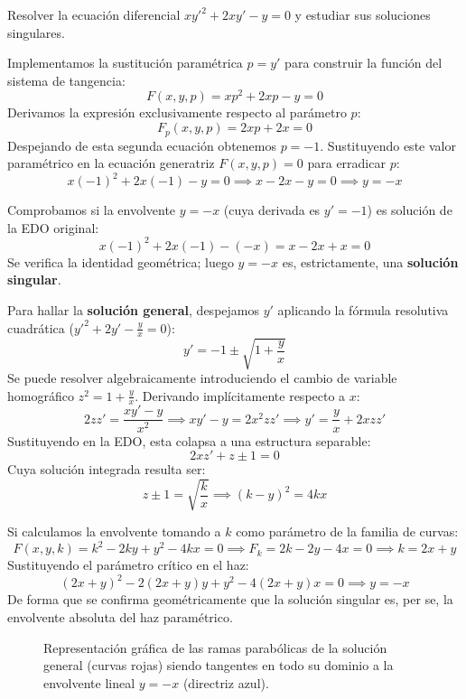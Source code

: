 \begin{ejercicio}
Resolver la ecuación diferencial $xy'^2 + 2xy' - y = 0$ y estudiar sus soluciones singulares.
\end{ejercicio}

\begin{tcolorbox}
Implementamos la sustitución paramétrica $p = y'$ para construir la función del sistema de tangencia:
$$ F(x,y,p) = xp^2 + 2xp - y = 0 $$
Derivamos la expresión exclusivamente respecto al parámetro $p$:
$$ F_p(x,y,p) = 2xp + 2x = 0 $$
Despejando de esta segunda ecuación obtenemos $p = -1$.
Sustituyendo este valor paramétrico en la ecuación generatriz $F(x,y,p) = 0$ para erradicar $p$:
$$ x(-1)^2 + 2x(-1) - y = 0 \implies x - 2x - y = 0 \implies y = -x $$

Comprobamos si la envolvente $y = -x$ (cuya derivada es $y' = -1$) es solución de la EDO original:
$$ x(-1)^2 + 2x(-1) - (-x) = x - 2x + x = 0 $$
Se verifica la identidad geométrica; luego $y = -x$ es, estrictamente, una \textbf{solución singular}.

Para hallar la \textbf{solución general}, despejamos $y'$ aplicando la fórmula resolutiva cuadrática ($y'^2 + 2y' - \frac{y}{x} = 0$):
$$ y' = -1 \pm \sqrt{1 + \frac{y}{x}} $$
Se puede resolver algebraicamente introduciendo el cambio de variable homográfico $z^2 = 1 + \frac{y}{x}$. Derivando implícitamente respecto a $x$:
$$ 2z z' = \frac{xy' - y}{x^2} \implies xy' - y = 2x^2 z z' \implies y' = \frac{y}{x} + 2xz z' $$
Sustituyendo en la EDO, esta colapsa a una estructura separable:
$$ 2x z' + z \pm 1 = 0 $$
Cuya solución integrada resulta ser:
$$ z \pm 1 = \sqrt{\frac{k}{x}} \implies (k-y)^2 = 4kx $$

Si calculamos la envolvente tomando a $k$ como parámetro de la familia de curvas:
$$ F(x,y,k) = k^2 - 2ky + y^2 - 4kx = 0 \implies F_k = 2k - 2y - 4x = 0 \implies k = 2x+y $$
Sustituyendo el parámetro crítico en el haz:
$$ (2x+y)^2 - 2(2x+y)y + y^2 - 4(2x+y)x = 0 \implies y = -x $$
De forma que se confirma geométricamente que la solución singular es, per se, la envolvente absoluta del haz paramétrico.

\begin{figure}[H]
    \centering
    
    \caption{Representación gráfica de las ramas parabólicas de la solución general (curvas rojas) siendo tangentes en todo su dominio a la envolvente lineal $y=-x$ (directriz azul).}
\end{figure}
\end{tcolorbox}

